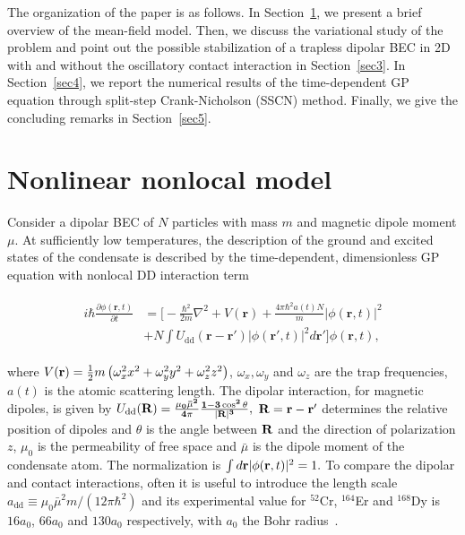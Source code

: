 \documentclass[amsmath,amssymb,article,twocolumn,superscriptaddress,showpacs,10pt]{revtex4-1}
\begin{document}
The organization of the paper is as follows. In Section~\ref{sec2}, we present a brief overview of the mean-field model. Then, we discuss the variational study of the problem and point out the possible stabilization of a trapless dipolar BEC in 2D with and without the oscillatory contact interaction in Section~\ref{sec3}. In Section~\ref{sec4}, we report the numerical results of the time-dependent GP equation through split-step Crank-Nicholson (SSCN) method. Finally, we give the concluding remarks in Section~\ref{sec5}.\\


\section{Nonlinear nonlocal model}
\label{sec2}

Consider a dipolar BEC of $N$ particles with mass $m$ and magnetic dipole moment $\mu$. At sufficiently low temperatures, the description of the ground and excited states of the condensate is described by the time-dependent, dimensionless GP equation with nonlocal DD interaction term \cite{Koch:2008,Lahaye:2009,Muruganandam:2012,Muruganandam:2011,Lahaye:2008}

\begin{align}
\begin{split}
i\hbar\frac{\partial \phi({\mathbf r},t)}{\partial t} &=\Big[-\frac{\hbar^2}{2m}\nabla^2+V({\mathbf r}) + \frac{4\pi\hbar^2a(t)N}{m}\left\vert \phi({\mathbf r},t)\right\vert^2 \\ & +N \int U_{\mathrm{dd}}({\mathbf  r}-{\mathbf r}')\left\vert\phi({\mathbf r}',t)\right\vert^2 d{\mathbf r}' \Big]\phi({\mathbf r},t), \label{eqn:dgpe}
\end{split}
\end{align}

where $V({\mathbf r}) = \frac{1}{2} m \left(\omega_x^2 x^2+\omega_y^2 y^2+ \omega_z^2 z^2 \right) \notag$, $\omega_x, \omega_y $ and $\omega_z$ are the trap frequencies, $a(t)$ is the atomic scattering length. The dipolar interaction, for magnetic dipoles, is given by $ U_{\mathrm{dd}}(\bf R)=\frac{\mu_0 \bar \mu^2}{4\pi}\frac{1-3\cos^2 \theta}{ \vert  {\bf R} \vert  ^3},$ ${\bf R= r -r'}$ determines the relative position of dipoles and $\theta$  is the angle between ${\bf R}$ and the direction of polarization $z$, $\mu_0$ is the permeability of free space and $\bar \mu$ is the dipole moment of the condensate atom. The normalization is $\int d{\bf r}\vert\phi({\mathbf r},t)\vert ^2=1.$ 
To compare the dipolar and contact interactions, often it is useful to introduce the length scale $a_{\mathrm{dd}}\equiv \mu_0 \bar \mu^2 m/(12\pi \hbar^2)$ and its experimental value for $^{52}$Cr, $^{164}$Er and $^{168}$Dy is $16a_0$, $66a_0$ and $130a_0$ respectively, with $a_0$ the Bohr radius~\cite{Koch:2008,Lahaye:2009}. 
\end{document}
